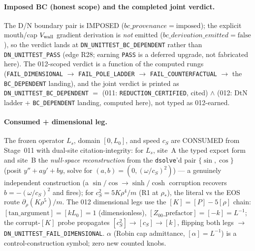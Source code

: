 \paragraph{Imposed BC (honest scope) and the completed joint verdict.}
The D/N boundary pair is IMPOSED (\(bc\_provenance=\text{imposed}\)); the explicit
mouth/cap \(V_{\rm wall}\) gradient derivation is \emph{not} emitted
(\(bc\_derivation\_emitted=\text{false}\)), so the verdict lands at
\texttt{DN\_UNITTEST\_BC\_DEPENDENT} rather than \texttt{DN\_UNITTEST\_PASS}
(edge R28; earning \texttt{PASS} is a deferred upgrade, not fabricated here). The
012-scoped verdict is a function of the computed rungs (\texttt{FAIL\_DIMENSIONAL}
\(\to\) \texttt{FAIL\_POLE\_LADDER} \(\to\) \texttt{FAIL\_COUNTERFACTUAL} \(\to\)
the \texttt{BC\_DEPENDENT} landing), and the joint verdict is printed as
\texttt{DN\_UNITTEST\_BC\_DEPENDENT} \(=\) (011: \texttt{REDUCTION\_CERTIFIED},
cited) \(\wedge\) (012: DtN ladder + \texttt{BC\_DEPENDENT} landing, computed
here), not typed as 012-earned.

\paragraph{Consumed + dimensional leg.}
The frozen operator \(L_s\), domain \([0,L_0]\), and speed \(c_S\) are CONSUMED
from Stage~011 with dual-site citation-integrity: for \(L_s\), site~A the typed
export form and site~B the \emph{null-space reconstruction} from the
\texttt{dsolve}'d pair \(\{\sin,\cos\}\) (posit \(y''+ay'+by\), solve for
\((a,b)=(0,(\omega/c_S)^2)\)) --- a genuinely independent construction (a
\(\sin/\cos\!\to\!\sinh/\cosh\) corruption recovers \(b=-(\omega/c_S)^2\) and
fires); for \(c_S^2=5K\rho^4/m\) (R1 at \(\rho_*\)), the literal vs the EOS route
\(\partial_\rho(K\rho^5)/m\). The 012 dimensional legs use the
\([K]=[P]-5[\rho]\) chain: \([\text{tan\_argument}]=[kL_0]=1\) (dimensionless),
\([Z_{00}\text{\_prefactor}]=[-k]=L^{-1}\); the corrupt-\([K]\) probe propagates
\([c_S^2]\to[c_S]\to[k]\), flipping both legs \(\to\)
\texttt{DN\_UNITTEST\_FAIL\_DIMENSIONAL}. \(\alpha\) (Robin cap admittance,
\([\alpha]=L^{-1}\)) is a control-construction symbol; zero new counted knobs.

